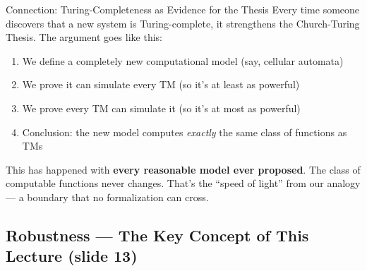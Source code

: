 \begin{conceptbox}{Connection: Turing-Completeness as Evidence for the Thesis}
Every time someone discovers that a new system is Turing-complete, it
strengthens the Church-Turing Thesis. The argument goes like this:

\begin{enumerate}[nosep]
\item We define a completely new computational model (say, cellular automata)
\item We prove it can simulate every TM (so it's at least as powerful)
\item We prove every TM can simulate it (so it's at most as powerful)
\item Conclusion: the new model computes \emph{exactly} the same class of
  functions as TMs
\end{enumerate}

This has happened with \textbf{every reasonable model ever proposed}. The class
of computable functions never changes. That's the ``speed of light'' from our
analogy --- a boundary that no formalization can cross.

\end{conceptbox}


\subsection{Robustness --- The Key Concept of This Lecture (slide 13)}

